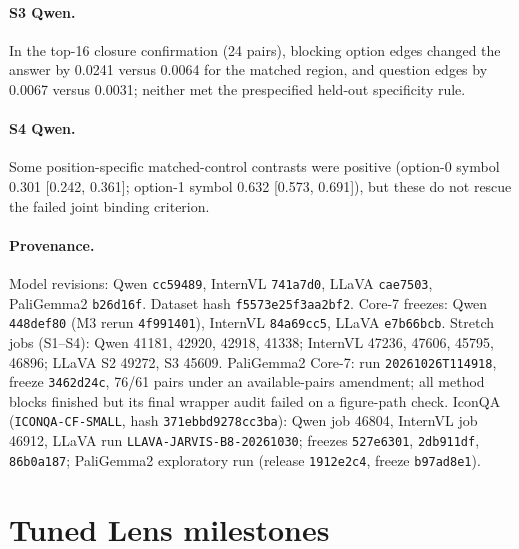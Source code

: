 \documentclass[11pt]{article}
\begin{document}
\paragraph{S3 Qwen.} In the top-16 closure confirmation (24 pairs), blocking option edges changed the answer by 0.0241 versus 0.0064 for the matched region, and question edges by 0.0067 versus 0.0031; neither met the prespecified held-out specificity rule.

\paragraph{S4 Qwen.} Some position-specific matched-control contrasts were positive (option-0 symbol 0.301 [0.242, 0.361]; option-1 symbol 0.632 [0.573, 0.691]), but these do not rescue the failed joint binding criterion.

\paragraph{Provenance.} Model revisions: Qwen \texttt{cc59489}, InternVL \texttt{741a7d0}, LLaVA \texttt{cae7503}, PaliGemma2 \texttt{b26d16f}. Dataset hash \texttt{f5573e25f3aa2bf2}. Core-7 freezes: Qwen \texttt{448def80} (M3 rerun \texttt{4f991401}), InternVL \texttt{84a69cc5}, LLaVA \texttt{e7b66bcb}. Stretch jobs (S1--S4): Qwen 41181, 42920, 42918, 41338; InternVL 47236, 47606, 45795, 46896; LLaVA S2 49272, S3 45609. PaliGemma2 Core-7: run \texttt{20261026T114918}, freeze \texttt{3462d24c}, 76/61 pairs under an available-pairs amendment; all method blocks finished but its final wrapper audit failed on a figure-path check. IconQA (\texttt{ICONQA-CF-SMALL}, hash \texttt{371ebbd9278cc3ba}): Qwen job 46804, InternVL job 46912, LLaVA run \texttt{LLAVA-JARVIS-B8-20261030}; freezes \texttt{527e6301}, \texttt{2db911df}, \texttt{86b0a187}; PaliGemma2 exploratory run (release \texttt{1912e2c4}, freeze \texttt{b97ad8e1}).

\section{Tuned Lens milestones}
\label{app:tuned}
\end{document}
